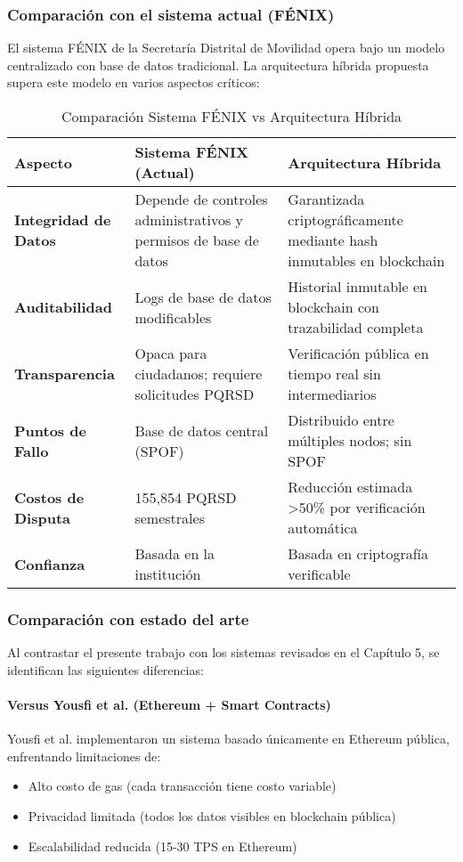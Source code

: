 \subsubsection{Comparación con el sistema actual (FÉNIX)}

El sistema FÉNIX de la Secretaría Distrital de Movilidad opera bajo un modelo centralizado con base de datos tradicional. La arquitectura híbrida propuesta supera este modelo en varios aspectos críticos:

\begin{table}[h]
\centering
\small
\begin{tabular}{|p{4cm}|p{5cm}|p{5cm}|}
\hline
\textbf{Aspecto} & \textbf{Sistema FÉNIX (Actual)} & \textbf{Arquitectura Híbrida} \\ \hline
\textbf{Integridad de Datos} & Depende de controles administrativos y permisos de base de datos & Garantizada criptográficamente mediante hash inmutables en blockchain \\ \hline
\textbf{Auditabilidad} & Logs de base de datos modificables & Historial inmutable en blockchain con trazabilidad completa \\ \hline
\textbf{Transparencia} & Opaca para ciudadanos; requiere solicitudes PQRSD & Verificación pública en tiempo real sin intermediarios \\ \hline
\textbf{Puntos de Fallo} & Base de datos central (SPOF) & Distribuido entre múltiples nodos; sin SPOF \\ \hline
\textbf{Costos de Disputa} & 155,854 PQRSD semestrales & Reducción estimada >50\% por verificación automática \\ \hline
\textbf{Confianza} & Basada en la institución & Basada en criptografía verificable \\ \hline
\end{tabular}
\caption{Comparación Sistema FÉNIX vs Arquitectura Híbrida}
\label{tab:comparacion_fenix}
\end{table}

\subsubsection{Comparación con estado del arte}

Al contrastar el presente trabajo con los sistemas revisados en el Capítulo 5, se identifican las siguientes diferencias:

\paragraph{Versus Yousfi et al. (Ethereum + Smart Contracts)}
Yousfi et al. implementaron un sistema basado únicamente en Ethereum pública, enfrentando limitaciones de:
\begin{itemize}
    \item Alto costo de gas (cada transacción tiene costo variable)
    \item Privacidad limitada (todos los datos visibles en blockchain pública)
    \item Escalabilidad reducida (15-30 TPS en Ethereum)
\end{itemize}

